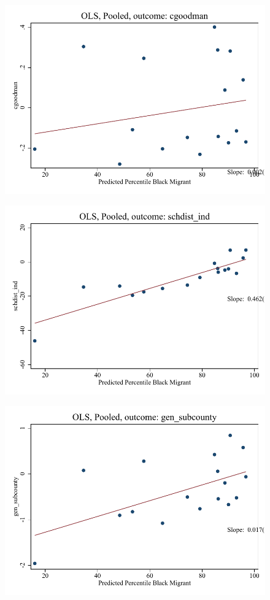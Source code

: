 \documentclass{article}
\begin{document}
\clearpage
\begin{figure}
	\centering
	\includegraphics[width=.8\textwidth]{figures/binscatter/pooled_cgoodman_ols_percentile.pdf}
\end{figure}
\clearpage
\begin{figure}
	\centering
	\includegraphics[width=.8\textwidth]{figures/binscatter/pooled_schdist_ind_ols_percentile.pdf}
\end{figure}
\clearpage
\begin{figure}
	\centering
	\includegraphics[width=.8\textwidth]{figures/binscatter/pooled_gen_subcounty_ols_percentile.pdf}
\end{figure}
\end{document}
